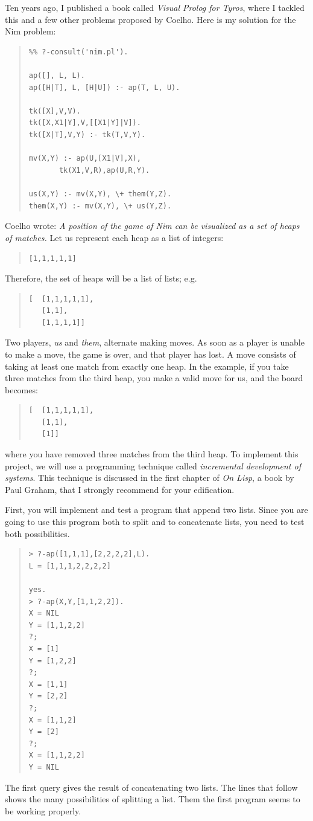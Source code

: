 \documentclass[a4paper,12pt]{book}
\begin{document}
Ten years ago, I published a book called {\em Visual Prolog for
Tyros}, where I tackled this and a few other problems proposed
by Coelho. Here is my solution for the Nim problem:
\begin{quote}
\begin{verbatim}
%% ?-consult('nim.pl').

ap([], L, L).
ap([H|T], L, [H|U]) :- ap(T, L, U).

tk([X],V,V).
tk([X,X1|Y],V,[[X1|Y]|V]).
tk([X|T],V,Y) :- tk(T,V,Y).

mv(X,Y) :- ap(U,[X1|V],X),
       tk(X1,V,R),ap(U,R,Y).

us(X,Y) :- mv(X,Y), \+ them(Y,Z).
them(X,Y) :- mv(X,Y), \+ us(Y,Z).
\end{verbatim}
\end{quote}
Coelho wrote: {\em A position of the game of Nim can be
visualized as a set of heaps of matches.} Let us represent
each heap as a list of integers:
\begin{quote}
	\verb|[1,1,1,1,1]|
\end{quote}
Therefore, the set of heaps will be a list of lists; e.g.
\begin{quote}
\begin{verbatim}
[  [1,1,1,1,1],
   [1,1],
   [1,1,1,1]]
\end{verbatim}
\end{quote}

Two players, {\em us} and {\em them}, alternate making
moves. As soon as a player is unable to make a move,
the game is over, and that player has lost. A move consists
of taking at least one match from exactly one heap. In the
example, if you take three matches from the third heap,
you make a valid move for us, and the board becomes:
\begin{quote}
\begin{verbatim}
[  [1,1,1,1,1],
   [1,1],
   [1]]
\end{verbatim}
\end{quote}
where you have removed three matches from the third heap.
To implement this project, we will use a programming
technique called {\em incremental development of systems}.
This technique is discussed in the first chapter of
{\em On Lisp}, a book by Paul Graham, that I strongly
recommend for your edification. 

First, you will implement and test a program that append
two lists. Since you are going to use this program both
to split and to concatenate lists, you need to test
both possibilities. 
\begin{quote}
\begin{verbatim}
> ?-ap([1,1,1],[2,2,2,2],L).
L = [1,1,1,2,2,2,2]

yes.
> ?-ap(X,Y,[1,1,2,2]).
X = NIL
Y = [1,1,2,2]
?;
X = [1]
Y = [1,2,2]
?;
X = [1,1]
Y = [2,2]
?;
X = [1,1,2]
Y = [2]
?;
X = [1,1,2,2]
Y = NIL
\end{verbatim}
\end{quote}
The first query gives the result of concatenating two
lists. The lines that follow shows the many possibilities
of splitting a list. Them the first program seems to be
working properly. 
\end{document}
